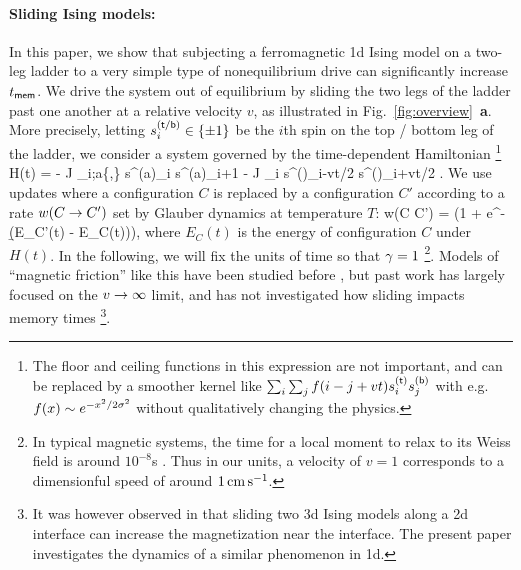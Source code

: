 \documentclass[prl,aps,twocolumn,groupedaddress,superscriptaddress,preprintnumbers,nobibnotes]{revtex4-2}
\newcommand{\tmem}{{t_{\sf mem}}}
\begin{document}
	\paragraph*{Sliding Ising models:} In this paper, we show that subjecting a ferromagnetic 1d Ising model on a two-leg ladder to a very simple type of nonequilibrium drive can significantly increase $\tmem$. We drive the system out of equilibrium by sliding the two legs of the ladder past one another at a relative velocity $v$, as illustrated in Fig.~\ref{fig:overview}~{\bf a}. More precisely, letting $s^{(\mathsf{t} / \mathsf{b})}_i \in \{ \pm 1\}$ be the $i$th spin on the top / bottom leg of the ladder, we consider a system governed by the time-dependent Hamiltonian \footnote{The floor and ceiling functions in this expression are not important, and can be replaced by a smoother kernel like $\sum_i \sum_j f(i-j+vt) s_i^{(\mathsf{t})} s_j^{(\mathsf{b})}$ with e.g. $f(x) \sim e^{-x^2/{2\sigma^2}}$ without qualitatively changing the physics. } 
	\be \label{ham} H(t) = - J \sum_{i;a\in\{\sft,\sfb\}} s^{(a)}_i s^{(a)}_{i+1} - J \sum_i s^{(\sft)}_{\lfloor i-vt/2 \rfloor} s^{(\sfb)}_{\lceil i+vt/2\rceil}  .\ee 
	We use updates where a configuration $C$ is replaced by a configuration $C'$ according to a rate $w(C\rightarrow C')$ set by Glauber dynamics at temperature $T$:
	\be w(C \ra C') = \g (1 + e^{-\b (E_{C'}(t) - E_C(t))})\inv, \ee 
	where $E_C(t)$ is the energy of configuration $C$ under $H(t)$. In the following, we will fix the units of time so that $\gamma=1$ \footnote{In typical magnetic systems, the time for a local moment to relax to its Weiss field is around $10^{-8}$s \cite{angst2012strongly}. Thus in our units, a velocity of $v=1$ corresponds to a dimensionful speed of around $1 \,{\rm cm}\, {\rm s}^{-1}$.}. 		
	Models of ``magnetic friction'' like this have been studied before \cite{kadau2008magnetic,hucht2009nonequilibrium,hilhorst2011two}, but past work has largely focused on the $v \rightarrow\infty$ limit, and has not investigated how sliding impacts memory times \footnote{It was however observed in \cite{kadau2008magnetic} that sliding two 3d Ising models along a 2d interface can increase the magnetization near the interface. The present paper investigates the dynamics of a similar phenomenon in 1d.}. 
	
		
		
\end{document}
